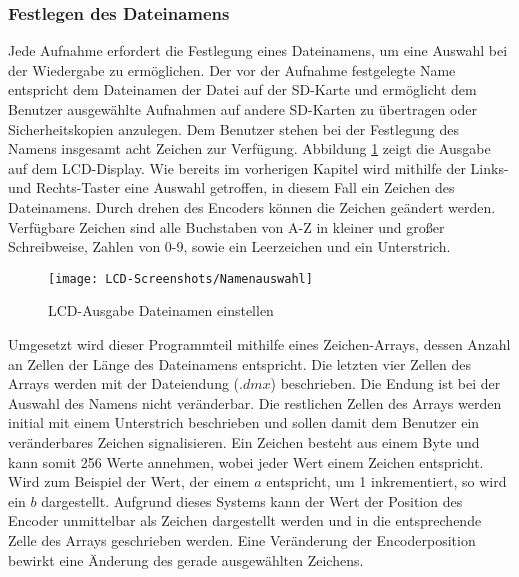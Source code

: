 \subsubsection{Festlegen des Dateinamens}
Jede Aufnahme erfordert die Festlegung eines Dateinamens, um eine Auswahl bei der Wiedergabe zu ermöglichen. Der vor der Aufnahme festgelegte Name entspricht dem Dateinamen der Datei auf der SD-Karte und ermöglicht dem Benutzer ausgewählte Aufnahmen auf andere SD-Karten zu übertragen oder Sicherheitskopien anzulegen. Dem Benutzer stehen bei der Festlegung des Namens insgesamt acht Zeichen zur Verfügung. Abbildung \ref{lcd:filename} zeigt die Ausgabe auf dem LCD-Display. Wie bereits im vorherigen Kapitel wird mithilfe der Links- und Rechts-Taster eine Auswahl getroffen, in diesem Fall ein Zeichen des Dateinamens. Durch drehen des Encoders können die Zeichen geändert werden. Verfügbare Zeichen sind alle Buchstaben von A-Z in kleiner und großer Schreibweise, Zahlen von 0-9, sowie ein Leerzeichen und ein Unterstrich.
\begin{figure}[h]
	\begin{center}
		\texttt{[image: LCD-Screenshots/Namenauswahl]}
		\caption{LCD-Ausgabe Dateinamen einstellen}
		\label{lcd:filename}
	\end{center}
\end{figure}
Umgesetzt wird dieser Programmteil mithilfe eines Zeichen-Arrays, dessen Anzahl an Zellen der Länge des Dateinamens entspricht. Die letzten vier Zellen des Arrays werden mit der Dateiendung ($.dmx$) beschrieben. Die Endung ist bei der Auswahl des Namens nicht veränderbar. Die restlichen Zellen des Arrays werden initial mit einem Unterstrich beschrieben und sollen damit dem Benutzer ein veränderbares Zeichen signalisieren. Ein Zeichen besteht aus einem Byte und kann somit 256 Werte annehmen, wobei jeder Wert einem Zeichen entspricht. Wird zum Beispiel der Wert, der einem $a$ entspricht, um 1 inkrementiert, so wird ein $b$ dargestellt. Aufgrund dieses Systems kann der Wert der Position des Encoder unmittelbar als Zeichen dargestellt werden und in die entsprechende Zelle des Arrays geschrieben werden. Eine Veränderung der Encoderposition bewirkt eine Änderung des gerade ausgewählten Zeichens.

